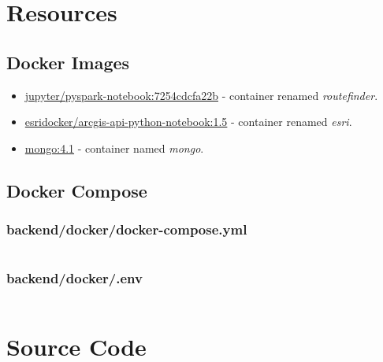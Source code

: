 \chapter{Resources}
\section{Docker Images}\label{docker-images}
\begin{itemize}
  \item \href{https://hub.docker.com/r/jupyter/pyspark-notebook}{jupyter/pyspark-notebook:7254cdcfa22b}\cite{img-pyspark} - container renamed \emph{routefinder}.
  \item \href{https://hub.docker.com/r/esridocker/arcgis-api-python-notebook}{esridocker/arcgis-api-python-notebook:1.5}\cite{img-esri} - container renamed \emph{esri}.
  \item \href{https://hub.docker.com/_/mongo}{mongo:4.1}\cite{img-mongo} - container named \emph{mongo}.
\end{itemize}


\section{Docker Compose}

\subsection{backend/docker/docker-compose.yml}
\inputminted{yaml}{../backend/docker/docker-compose.yml}
\subsection{backend/docker/.env}
\inputminted{yaml}{../backend/docker/.env}


\chapter{Source Code}\label{code}
